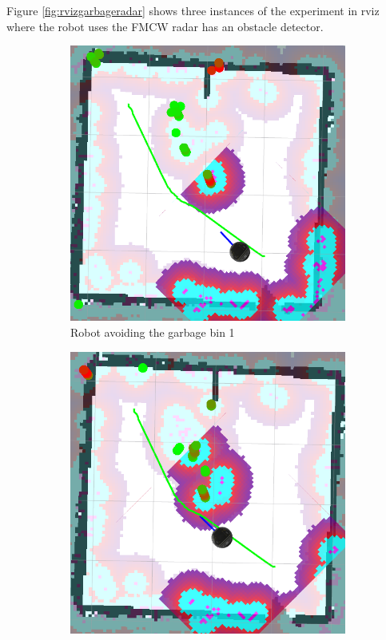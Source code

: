 Figure \ref{fig:rvizgarbageradar} shows three instances of the experiment in rviz where the robot uses the \ac{FMCW} \ac{radar} has an obstacle detector.
\begin{figure}[ht!]
  \centering
  \begin{subfigure}[t]{0.3\linewidth}
    \includegraphics[width=\linewidth]{imgs/chapter5/rvizgarbageradar3.png}
     \caption{Robot avoiding the garbage bin 1}
     \label{fig::rvizgarbageradar1}
  \end{subfigure}
  \begin{subfigure}[t]{0.3\linewidth}
    \includegraphics[width=\linewidth]{imgs/chapter5/rvizgarbageradar1.png}

\end{subfigure}
\end{figure}
